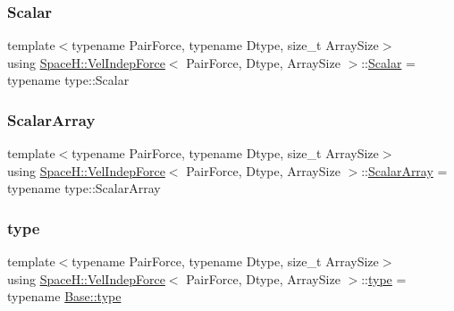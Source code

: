 \subsubsection{\texorpdfstring{Scalar}{Scalar}}
{\footnotesize\ttfamily template$<$typename Pair\+Force, typename Dtype, size\+\_\+t Array\+Size$>$ \\
using \mbox{\hyperlink{struct_space_h_1_1_vel_indep_force}{Space\+H\+::\+Vel\+Indep\+Force}}$<$ Pair\+Force, Dtype, Array\+Size $>$\+::\mbox{\hyperlink{struct_space_h_1_1_vel_indep_force_acd8813e87e53d01f1c824fcac58b7c1e}{Scalar}} =  typename type\+::\+Scalar}

\mbox{\label{struct_space_h_1_1_vel_indep_force_a05d04af454b5217024f5fff45d7e4d32}} 
\subsubsection{\texorpdfstring{Scalar\+Array}{ScalarArray}}
{\footnotesize\ttfamily template$<$typename Pair\+Force, typename Dtype, size\+\_\+t Array\+Size$>$ \\
using \mbox{\hyperlink{struct_space_h_1_1_vel_indep_force}{Space\+H\+::\+Vel\+Indep\+Force}}$<$ Pair\+Force, Dtype, Array\+Size $>$\+::\mbox{\hyperlink{struct_space_h_1_1_vel_indep_force_a05d04af454b5217024f5fff45d7e4d32}{Scalar\+Array}} =  typename type\+::\+Scalar\+Array}

\mbox{\label{struct_space_h_1_1_vel_indep_force_a01b848e02573e4aa9580cec647efda9c}} 
\subsubsection{\texorpdfstring{type}{type}}
{\footnotesize\ttfamily template$<$typename Pair\+Force, typename Dtype, size\+\_\+t Array\+Size$>$ \\
using \mbox{\hyperlink{struct_space_h_1_1_vel_indep_force}{Space\+H\+::\+Vel\+Indep\+Force}}$<$ Pair\+Force, Dtype, Array\+Size $>$\+::\mbox{\hyperlink{struct_space_h_1_1_vel_indep_force_a01b848e02573e4aa9580cec647efda9c}{type}} =  typename \mbox{\hyperlink{struct_space_h_1_1_force_a151c6ae1ec7ad87825c2b6cc74aee5f2}{Base\+::type}}}

